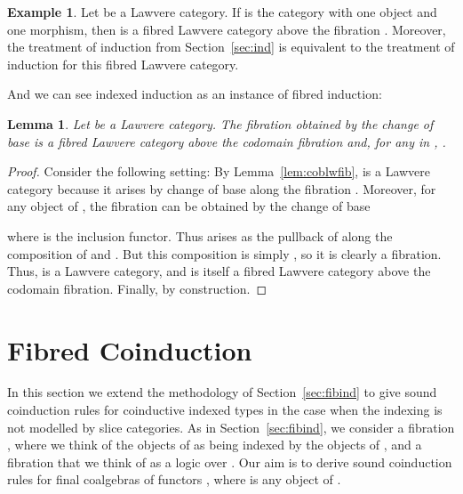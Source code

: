\documentclass{LMCS}
\theoremstyle{plain}
\newtheorem{lemma}[theorem]{Lemma}
\theoremstyle{remark}
\theoremstyle{definition}
\newtheorem{example}[theorem]{Example}
\begin{document}
\begin{example}\label{ex:sec2}
  Let  be a Lawvere category. If  is the category with
  one object and one morphism, then  is a fibred Lawvere category
  above the fibration . Moreover, the treatment of
  induction from Section~\ref{sec:ind} is equivalent to the treatment
  of induction for this fibred Lawvere category.
\end{example}

And we can see indexed induction as an instance of fibred induction:

\begin{lemma}\label{lem:canlwfiba}
  Let  be a Lawvere category. The fibration
   obtained by the change of base
   is a fibred Lawvere category above the codomain fibration and,
  for any  in , .
\end{lemma}
\begin{proof}
  Consider the following setting:
   By Lemma~\ref{lem:coblwfib},  is a
  Lawvere category because it arises by change of base along the
  fibration . Moreover, for any object  of , the fibration
   can be obtained by the change of base
  

\vspace*{0.05in}

\noindent
  where  is the inclusion functor. Thus  arises as the
  pullback of  along the composition of  and
  . But this composition is simply , so it is clearly a fibration. Thus,  is a Lawvere
  category, and  is itself a fibred Lawvere category above the
  codomain fibration. Finally,  by construction.
\end{proof}

\section{Fibred Coinduction}\label{sec:fibcoind}

In this section we extend the methodology of Section~\ref{sec:fibind}
to give sound coinduction rules for coinductive indexed types in the
case when the indexing is not modelled by slice categories. As in
Section~\ref{sec:fibind}, we consider a fibration , where
we think of the objects of  as being indexed by the objects of
, and a fibration  that we think of as a logic over
. Our aim is to derive sound coinduction rules for final
coalgebras of functors , where  is any object of
.
\end{document}
